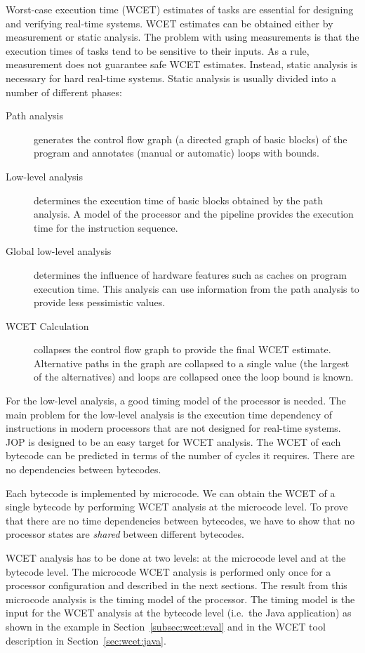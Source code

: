 Worst-case execution time (WCET) estimates of tasks are essential
for designing and verifying real-time systems. WCET estimates can be
obtained either by measurement or static analysis. The problem with
using measurements is that the execution times of tasks tend to be
sensitive to their inputs. As a rule, measurement does not guarantee
safe WCET estimates. Instead, static analysis is necessary for hard
real-time systems. Static analysis is usually divided into a number
of different phases:
\begin{description}
    \item[Path analysis] generates the control flow graph (a directed
    graph of basic blocks) of the program and annotates (manual or
    automatic) loops with bounds.
    \item[Low-level analysis] determines the execution time of basic
    blocks obtained by the path analysis. A model of the processor
    and the pipeline provides the execution time for the instruction
    sequence.
    \item[Global low-level analysis] determines the influence of
    hardware features such as caches on program execution time. This
    analysis can use information from the path analysis to provide less
    pessimistic values.
    \item[WCET Calculation] collapses the control flow graph to
    provide the final WCET estimate. Alternative paths in the graph
    are collapsed to a single value (the largest of the alternatives)
    and loops are collapsed once the loop bound is known.
\end{description}

For the low-level analysis, a good timing model of the processor is
needed. The main problem for the low-level analysis is the execution
time dependency of instructions in modern processors that are not
designed for real-time systems. JOP is designed to be an easy target
for WCET analysis. The WCET of each bytecode can be predicted in
terms of the number of cycles it requires. There are no dependencies
between bytecodes.

Each bytecode is implemented by microcode. We can obtain the WCET of
a single bytecode by performing WCET analysis at the microcode
level. To prove that there are no time dependencies between
bytecodes, we have to show that no processor states are
\emph{shared} between different bytecodes.

WCET analysis has to be done at two levels: at the microcode level
and at the bytecode level. The microcode WCET analysis is performed
only once for a processor configuration and described in the next
sections. The result from this microcode analysis is the timing
model of the  processor. The timing model is the input for the WCET
analysis at the bytecode level (i.e.\ the Java application) as shown
in the example in Section~\ref{subsec:wcet:eval} and in the WCET
tool description in Section~\ref{sec:wcet:java}.


